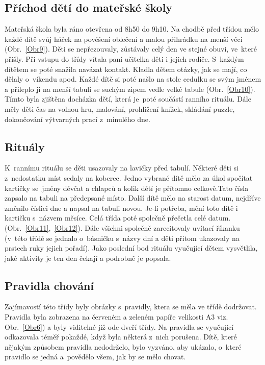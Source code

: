 		\subsection{Příchod dětí do mateřské školy}
		\label{prichod}
			Mateřská škola byla ráno otevřena od 8h50 do 9h10. Na chodbě před třídou mělo každé dítě svůj háček na pověšení oblečení a malou přihrádku na menší věci (Obr.~\ref{Obr9}). Děti se nepřezouvaly, zůstávaly celý den ve stejné obuvi, ve které přišly. Při vstupu do třídy vítala paní učitelka děti i jejich rodiče. S každým dítětem se poté snažila navázat kontakt. Kladla dětem otázky, jak se mají, co dělaly o~víkendu apod. Každé dítě si poté našlo na stole cedulku se svým jménem a přileplo ji na menší tabuli se suchým zipem vedle velké tabule (Obr.~\ref{Obr10}). Tímto byla zjištěna docházka dětí, která je poté součástí ranního rituálu. Dále měly děti čas na volnou hru, malování, prohlížení knížek, skládání puzzle, dokončování výtvarných prací z minulého dne.
		
		\subsection{Rituály}
		\label{ritualy}
			K~rannímu rituálu se děti usazovaly na lavičky před tabulí. Některé děti si z nedostatku míst sedaly na koberec. Jedno vybrané dítě mělo za úkol spočítat kartičky se jmény děvčat a chlapců a kolik dětí je přítomno celkově.Tato čísla zapsalo na tabuli na předepsané místo. Další dítě mělo na starost datum, nejdříve změnilo číslici dne a napsal na tabuli novou. Je-li potřeba, mění toto dítě i kartičku s~názvem měsíce. Celá třída poté společně přečetla celé datum. (Obr.~\ref{Obr11},~\ref{Obr12}). Dále všichni společně zarecitovaly uvítací říkanku (v~této třídě se jednalo o~básničku s názvy dní a děti přitom ukazovaly na prstech ruky jejich pořadí). Jako poslední bod rituálu vyučující dětem vysvětlila, jaké aktivity je ten den čekají a podrobně je popsala. 

		\subsection{Pravidla chování}
		\label{pravidlaChovani}
			Zajímavostí této třídy byly obrázky s~pravidly, ktera se měla ve třídě dodržovat. Pravidla byla zobrazena na červeném a zeleném papíře velikosti A3 viz. Obr.~\ref{Obr6}) a byly viditelné již ode dveří třídy. Na pravidla se vyučující odkazovala téměř pokaždé, když byla některá z nich porušena. Dítě, které nějakým způsobem pravidla nedodrželo, bylo vyzváno, aby ukázalo, o~které pravidlo se jedná a povědělo všem, jak by se mělo chovat. 

